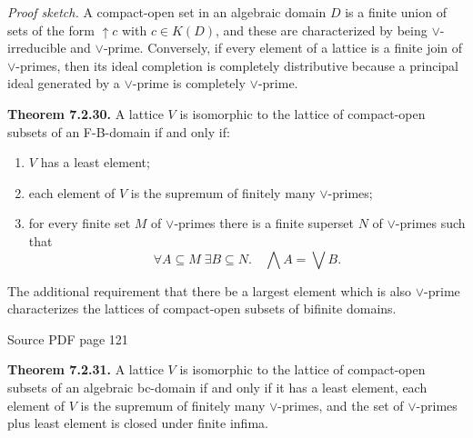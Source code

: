 \documentclass[11pt]{article}
\newcommand{\leanmarker}[2]{%
  \Needspace{3\baselineskip}%
  \marginnote{\hyperlink{#1}{\color{LeanTeal}\fbox{\scriptsize Lean}}}%
  \hypertarget{#1}{\textbf{#2.}}%
}
\newcommand{\sourcepage}[1]{\par\medskip\noindent\textcolor{SourceGray}{\scriptsize Source PDF page #1}\par\smallskip}
\begin{document}
\textit{Proof sketch.} A compact-open set in an algebraic domain \(D\) is a finite union of sets of the form \(\uparrow c\) with \(c\in K(D)\), and these are characterized by being \(\vee\)-irreducible and \(\vee\)-prime. Conversely, if every element of a lattice is a finite join of \(\vee\)-primes, then its ideal completion is completely distributive because a principal ideal generated by a \(\vee\)-prime is completely \(\vee\)-prime.

\leanmarker{thm-7-2-30}{Theorem 7.2.30} A lattice \(V\) is isomorphic to the lattice of compact-open subsets of an F-B-domain if and only if:
\begin{enumerate}
\item \(V\) has a least element;
\item each element of \(V\) is the supremum of finitely many \(\vee\)-primes;
\item for every finite set \(M\) of \(\vee\)-primes there is a finite superset \(N\) of \(\vee\)-primes such that
\[
  \forall A\subseteq M\;\exists B\subseteq N.\quad \bigwedge A=\bigvee B.
\]
\end{enumerate}
The additional requirement that there be a largest element which is also \(\vee\)-prime characterizes the lattices of compact-open subsets of bifinite domains.

\sourcepage{121}
\leanmarker{thm-7-2-31}{Theorem 7.2.31} A lattice \(V\) is isomorphic to the lattice of compact-open subsets of an algebraic bc-domain if and only if it has a least element, each element of \(V\) is the supremum of finitely many \(\vee\)-primes, and the set of \(\vee\)-primes plus least element is closed under finite infima.

\begin{center}
\end{center}
\end{document}
